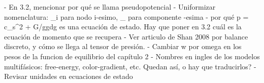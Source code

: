 - En 3.2, mencionar por qu\'e se llama pseudopotencial
- Uniformizar nomenclatura: _i para nodo i-esimo, _{\alpha} para componente {\alpha-}esima
- por qu\'e p = \rho c_s^2 + G/ggdg es una ecuaci\'on de estado. Hay que poner en 3.2 cu\'al es la ecuaci\'on de momento que se recupera
- Ver articulo de Shan 2008 por balance discreto, y c\'omo se llega al tensor de presi\'on.
- Cambiar w por omega en los pesos de la funcion de equilibrio del cap\'itulo 2
- Nombres en ingles de los modelos multif\'asicos: free-energy, color-gradient, etc. Quedan as\'i, o hay que traducirlos?
- Revisar unidades en ecuaciones de estado